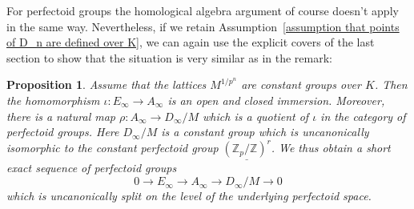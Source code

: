 \documentclass[11pt,oneside]{amsart}
\newtheorem{proposition}[theorem]{Proposition}
\theoremstyle{definition}
\theoremstyle{remark}
\begin{document}
	For perfectoid groups the homological algebra argument of course doesn't apply in the same way. Nevertheless, if we retain Assumption~\ref{assumption that points of D_n are defined over K}, we can again use the explicit covers of the last section to show that the situation is very similar as in the remark:
	\begin{proposition}\label{the morphism E->A in the limit}
		Assume that the lattices $M^{1/p^n}$ are constant groups over $K$. Then the homomorphism $\iota:E_\infty \rightarrow A_\infty$ is an open and closed immersion. Moreover, there is a natural map $\rho:A_\infty \rightarrow D_\infty/M$ which is a quotient of $\iota$ in the category of perfectoid groups. Here $D_\infty/M$ is a constant group which is uncanonically isomorphic to the constant perfectoid group $\underline{(\mathbb Z_p/\mathbb Z)^r}$. We thus obtain a short exact sequence of perfectoid groups
		\[0\rightarrow E_\infty \rightarrow A_\infty \rightarrow D_\infty/M\rightarrow 0\]
		which is uncanonically split on the level of the underlying perfectoid space.
	\end{proposition}
\end{document}
